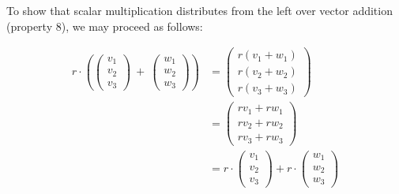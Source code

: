 
To show that scalar multiplication distributes from the left over vector addition (property 8), we may proceed as follows:

\begin{align*}
r \cdot \left(\left(\begin{array}{c}v_1\\v_2\\v_3\end{array}\right) ~+~\left(\begin{array}{c}w_1\\w_2\\w_3\end{array}\right) \right) &= \left(\begin{array}{c}r(v_1+w_1)\\r(v_2+w_2)\\r(v_3+w_3)\end{array}\right)\\
 &= \left(\begin{array}{c}rv_1+rw_1\\rv_2+rw_2\\rv_3+rw_3\end{array}\right)\\
& = r \cdot\left(\begin{array}{c}v_1\\v_2\\v_3\end{array}\right) + r \cdot\left(\begin{array}{c}w_1\\w_2\\w_3\end{array}\right)
\end{align*}

